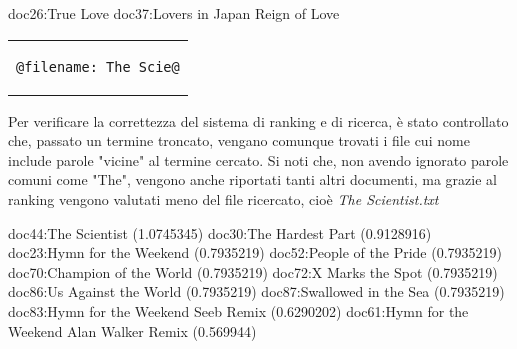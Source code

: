 \documentclass{article}
\begin{document}
doc26:True Love
doc37:Lovers in Japan   Reign of Love

\begin{center}
\begin{tabular}{c}
\begin{lstlisting}[style=prompt]
    @filename: The Scie@
\end{lstlisting}
\end{tabular}    
\end{center}
Per verificare la correttezza del sistema di ranking e di ricerca, è stato controllato che, passato un termine troncato, vengano comunque trovati i file cui nome include parole "vicine" al termine cercato. Si noti che, non avendo ignorato parole comuni come "The", vengono anche riportati tanti altri documenti, ma grazie al ranking vengono valutati meno del file ricercato, cioè \textit{The Scientist.txt}

doc44:The Scientist (1.0745345)
doc30:The Hardest Part (0.9128916)
doc23:Hymn for the Weekend (0.7935219)
doc52:People of the Pride (0.7935219)
doc70:Champion of the World (0.7935219)
doc72:X Marks the Spot (0.7935219)
doc86:Us Against the World (0.7935219)
doc87:Swallowed in the Sea (0.7935219)
doc83:Hymn for the Weekend  Seeb Remix  (0.6290202)
doc61:Hymn for the Weekend  Alan Walker Remix  (0.569944)

\iffalse
    \begin{itemize}
    \item \textit{\textbf{filename: "A Sky Full Of Stars"}}. Questa PhraseQuery, caratterizzata anche da lettere maiuscole, è stata utilizzata per testare che le maiuscole vengano correttamente ignorate, poiché sia per il filename che per il content, i vari termini sono stati indicizzati con tutte le lettere minuscole.
    \item \textit{\textbf{filename: "a sky full of stars"}}. In questo caso si è testato, tramite una PhraseQuery con solo minuscole, che il risultato della query precedente fosse uguale alla query in questione.
    \item \textit{\textbf{filename: -sky +full}}. La TermQuery corrente è caratterizzata da simboli posti come prefisso dei singoli termini e in questo caso la query, grazie al QueryParser, viene riconosciuta per eseguire una ricerca nel corpus dei file cui titolo presenta necessariamente "full", ma che non deve contenere "sky".
    \item \textit{\textbf{filename: LOVE}}. Si è testata l'indipendenza dalle maiuscole anche quando viene passato un solo termine, quindi per verificare che i documenti trovati siano relativi a file cui nome contiene la stessa parola in qualsiasi formato.
    \item \textit{\textbf{filename: The Scie}}. Per verificare la correttezza del sistema di ranking e di ricerca, è stato controllato che, passato un termine troncato, vengano comunque trovati i file cui nome include parole "vicine" al termine cercato. Si noti che, non avendo ignorato parole comuni come "The", vengono anche riportati tanti altri documenti, ma grazie al ranking vengono valutati meno del file ricercato, cioè \textit{The Scientist.txt}
\end{itemize}
\fi
\end{document}
